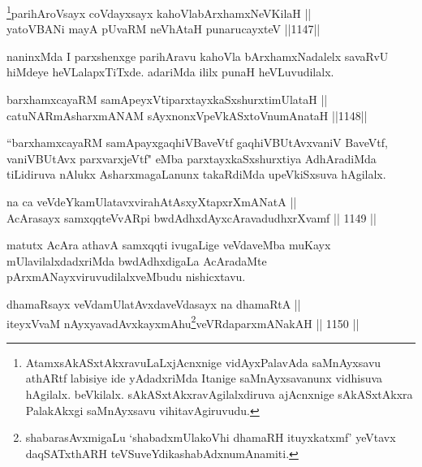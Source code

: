 
\begin{shl}
\footnote{AtamxsAkASxtAkxravuLaLxjAcnxnige vidAyxPalavAda saMnAyxsavu athARtf labisiye ide yAdadxriMda Itanige saMnAyxsavanunx vidhisuva hAgilalx. beVkilalx. sAkASxtAkxravAgilalxdiruva ajAcnxnige sAkASxtAkxra PalakAkxgi saMnAyxsavu vihitavAgiruvudu.}parihAroV\s sayx coVdayxsayx kahoVlabArxhamxNeV\s KilaH || \\
yatoV\s BANi mayA pUvaRM neVhAtaH punarucayxteV \hfill ||1147||  
\end{shl}

\begin{artha}
naninxMda I parxshenxge parihAravu kahoVla bArxhamxNadalelx savaRvU hiMdeye heVLalapxTiTxde. adariMda ililx punaH heVLuvudilalx.
\end{artha}


\begin{shl}
barxhamxcayaRM samApeyxVtiparxtayxkaSxshurxtimUlataH || \\
catuNARmAsharxmANAM sAyxnonxVpeVkASx\s toV\s numAnataH \hfill ||1148||  
\end{shl}

\begin{artha}
``barxhamxcayaRM samApayxgaqhiVBaveVtf gaqhiVBUtAvxvaniV BaveVtf, vaniVBUtAvx parxvarxjeVtf" eMba parxtayxkaSxshurxtiya AdhAradiMda tiLidiruva nAlukx AsharxmagaLanunx takaRdiMda upeVkiSxsuva hAgilalx.
\end{artha}

\begin{shl}
na ca veVdeYkamUlatavxvirahAtAsxyXtapxrXmANatA || \\
AcArasayx samxqqteVvAR\s pi bwdAdhxdAyxcAravadudhxrXvamf \hfill || 1149 ||  
\end{shl}

\begin{artha}
matutx AcAra athavA samxqqti ivugaLige veVdaveMba muKayx mUlavilalxdadxriMda bwdAdhxdigaLa AcAradaMte pArxmANayxviruvudilalxveMbudu nishicxtavu.
\end{artha}


\begin{shl}
dhamaRsayx veVdamUlatAvxdaveVdasayx na dhamaRtA ||  \\
iteyxVvaM nAyxyavadAvxkayxmAhu\footnote{shabarasAvxmigaLu `shabadxmUlakoVhi dhamaRH ituyxkatxmf' yeVtavx daqSATxthARH teVSu\break  veYdikashabAdxnumAnamiti.}veVRdaparxmANakAH \hfill || 1150 ||  
\end{shl}


